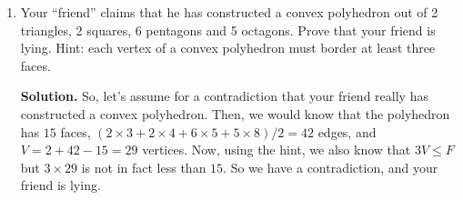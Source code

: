 \documentclass{book}
\begin{document}
\begin{activity}[]
\begin{enumerate}[font=\bfseries,label=(\alph*),ref=\alph*]
\item\label{task-46} \hypertarget{p-334}{}%
Your ``friend'' claims that he has constructed a convex polyhedron out of 2 triangles, 2 squares, 6 pentagons and 5 octagons. Prove that your friend is lying. Hint: each vertex of a convex polyhedron must border at least three faces.%
\par\smallskip%
\noindent\textbf{Solution.}\hypertarget{solution-31}{}\quad%
\hypertarget{p-335}{}%
So, let's assume for a contradiction that your friend really has constructed a convex polyhedron. Then, we would know that the polyhedron has \(15\) faces, \((2\times 3+2\times 4+6\times 5+5\times 8)/2 = 42\) edges, and \(V=2+42-15=29\) vertices. Now, using the hint, we also know that \(3V\leq F\) but \(3\times 29\) is not in fact less than \(15\). So we have a contradiction, and your friend is lying.%
\end{enumerate}
\end{activity}
\end{document}
